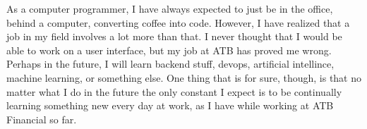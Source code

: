 \documentclass[letterpaper,12pt]{article}
\begin{document}
As a computer programmer, I have always expected to just be in the office, behind a computer,
converting coffee into code. However, I have realized that a job in my field
involves a lot more than that. I never thought that I would be able to work
on a user interface, but my job at ATB has proved me wrong.
Perhaps in the future, I will learn backend stuff, devops, artificial intellince,
machine learning, or something else. One thing that is for sure, though, is that
no matter what I do in the future the only constant I expect is to be
continually learning something new every day at work, as I have while working
at ATB Financial so far. 





\nocite{*}

\end{document}
